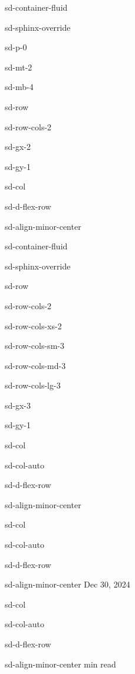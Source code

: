 \documentclass[letterpaper,10pt,english]{jupyterBook}
\begin{document}
\begin{sphinxuseclass}{sd-container-fluid}
\begin{sphinxuseclass}{sd-sphinx-override}
\begin{sphinxuseclass}{sd-p-0}
\begin{sphinxuseclass}{sd-mt-2}
\begin{sphinxuseclass}{sd-mb-4}
\begin{sphinxuseclass}{sd-row}
\begin{sphinxuseclass}{sd-row-cols-2}
\begin{sphinxuseclass}{sd-gx-2}
\begin{sphinxuseclass}{sd-gy-1}
\begin{sphinxuseclass}{sd-col}
\begin{sphinxuseclass}{sd-d-flex-row}
\begin{sphinxuseclass}{sd-align-minor-center}
\begin{sphinxuseclass}{sd-container-fluid}
\begin{sphinxuseclass}{sd-sphinx-override}
\begin{sphinxuseclass}{sd-row}
\begin{sphinxuseclass}{sd-row-cols-2}
\begin{sphinxuseclass}{sd-row-cols-xs-2}
\begin{sphinxuseclass}{sd-row-cols-sm-3}
\begin{sphinxuseclass}{sd-row-cols-md-3}
\begin{sphinxuseclass}{sd-row-cols-lg-3}
\begin{sphinxuseclass}{sd-gx-3}
\begin{sphinxuseclass}{sd-gy-1}
\begin{sphinxuseclass}{sd-col}
\begin{sphinxuseclass}{sd-col-auto}
\begin{sphinxuseclass}{sd-d-flex-row}
\begin{sphinxuseclass}{sd-align-minor-center}
\end{sphinxuseclass}
\end{sphinxuseclass}
\end{sphinxuseclass}
\end{sphinxuseclass}
\begin{sphinxuseclass}{sd-col}
\begin{sphinxuseclass}{sd-col-auto}
\begin{sphinxuseclass}{sd-d-flex-row}
\begin{sphinxuseclass}{sd-align-minor-center}
\sphinxAtStartPar
Dec 30, 2024

\end{sphinxuseclass}
\end{sphinxuseclass}
\end{sphinxuseclass}
\end{sphinxuseclass}
\begin{sphinxuseclass}{sd-col}
\begin{sphinxuseclass}{sd-col-auto}
\begin{sphinxuseclass}{sd-d-flex-row}
\begin{sphinxuseclass}{sd-align-minor-center}
 min read


\end{sphinxuseclass}
\end{sphinxuseclass}
\end{sphinxuseclass}
\end{sphinxuseclass}
\end{sphinxuseclass}
\end{sphinxuseclass}
\end{sphinxuseclass}
\end{sphinxuseclass}
\end{sphinxuseclass}
\end{sphinxuseclass}
\end{sphinxuseclass}
\end{sphinxuseclass}
\end{sphinxuseclass}
\end{sphinxuseclass}
\end{sphinxuseclass}
\end{sphinxuseclass}
\end{sphinxuseclass}
\end{sphinxuseclass}
\end{sphinxuseclass}
\end{sphinxuseclass}
\end{sphinxuseclass}
\end{sphinxuseclass}
\end{sphinxuseclass}
\end{sphinxuseclass}
\end{sphinxuseclass}
\end{sphinxuseclass}
\end{document}
